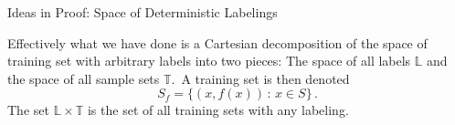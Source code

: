 \documentclass[10pt, table, dvipsnames,handout]{beamer}
\newcommand{\bT}{\ensuremath{\mathbb{T}}}
\newcommand{\bL}{\ensuremath{\mathbb{L}}}
\begin{document}
\begin{frame}[fragile]{Ideas in Proof: Space of Deterministic Labelings}
\begin{minipage}[t][0.4\textheight][t]{\textwidth}
  \end{minipage}
  \vfill
  \begin{minipage}[t][0.6\textheight][t]{\textwidth}
Effectively what we have done is a Cartesian decomposition of the space of training set with arbitrary labels into two pieces: The space of all labels $\bL$ and the space of all sample sets $\bT$.\pause\, A training set is then denoted 
$$
S_f = \{(x,f(x))\,:\, x\in S\}\,.
$$\pause
The set $\bL\times \bT$ is the set of all training sets with any labeling. 

\end{minipage}

\end{frame}
\end{document}

